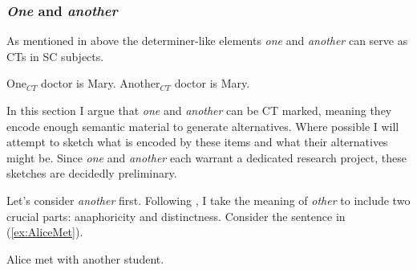 \documentclass[
	letterpaper,
]{article}
\begin{document}
\subsubsection{\textit{One} and \textit{another}}
As mentioned in above the determiner-like elements \textit{one} and \textit{another} can serve as CTs in SC subjects.
\begin{exe}
\ex\label{ex:AONeAnother}
\begin{xlist}
	\ex\label{ex:OneCT} One$_{CT}$ doctor is Mary.
	\ex\label{ex:AnotherCT} Another$_{CT}$ doctor is Mary.
\end{xlist}
\end{exe}

In this section I argue that \textit{one} and \textit{another} can be CT marked, meaning they encode enough semantic material to generate alternatives.
Where possible I will attempt to sketch what is encoded by these items and what their alternatives might be.
Since \textit{one} and \textit{another} each warrant a dedicated research project, these sketches are decidedly preliminary.

Let's consider \textit{another} first.
Following \textcite{heim1991reciprocity}, I take the meaning of  \textit{other} to include two crucial parts: anaphoricity and distinctness.
Consider the sentence in (\ref{ex:AliceMet}).
\begin{exe}
	\ex\label{ex:AliceMet} Alice met with another student.
\end{exe}
\end{document}
